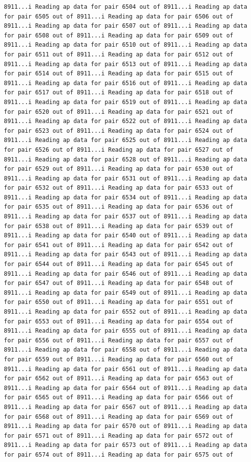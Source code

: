 \documentclass[
]{article}
\begin{document}
\begin{verbatim}
8911...i Reading ap data for pair 6504 out of 8911...i Reading ap data for pair 6505 out of 8911...i Reading ap data for pair 6506 out of 8911...i Reading ap data for pair 6507 out of 8911...i Reading ap data for pair 6508 out of 8911...i Reading ap data for pair 6509 out of 8911...i Reading ap data for pair 6510 out of 8911...i Reading ap data for pair 6511 out of 8911...i Reading ap data for pair 6512 out of 8911...i Reading ap data for pair 6513 out of 8911...i Reading ap data for pair 6514 out of 8911...i Reading ap data for pair 6515 out of 8911...i Reading ap data for pair 6516 out of 8911...i Reading ap data for pair 6517 out of 8911...i Reading ap data for pair 6518 out of 8911...i Reading ap data for pair 6519 out of 8911...i Reading ap data for pair 6520 out of 8911...i Reading ap data for pair 6521 out of 8911...i Reading ap data for pair 6522 out of 8911...i Reading ap data for pair 6523 out of 8911...i Reading ap data for pair 6524 out of 8911...i Reading ap data for pair 6525 out of 8911...i Reading ap data for pair 6526 out of 8911...i Reading ap data for pair 6527 out of 8911...i Reading ap data for pair 6528 out of 8911...i Reading ap data for pair 6529 out of 8911...i Reading ap data for pair 6530 out of 8911...i Reading ap data for pair 6531 out of 8911...i Reading ap data for pair 6532 out of 8911...i Reading ap data for pair 6533 out of 8911...i Reading ap data for pair 6534 out of 8911...i Reading ap data for pair 6535 out of 8911...i Reading ap data for pair 6536 out of 8911...i Reading ap data for pair 6537 out of 8911...i Reading ap data for pair 6538 out of 8911...i Reading ap data for pair 6539 out of 8911...i Reading ap data for pair 6540 out of 8911...i Reading ap data for pair 6541 out of 8911...i Reading ap data for pair 6542 out of 8911...i Reading ap data for pair 6543 out of 8911...i Reading ap data for pair 6544 out of 8911...i Reading ap data for pair 6545 out of 8911...i Reading ap data for pair 6546 out of 8911...i Reading ap data for pair 6547 out of 8911...i Reading ap data for pair 6548 out of 8911...i Reading ap data for pair 6549 out of 8911...i Reading ap data for pair 6550 out of 8911...i Reading ap data for pair 6551 out of 8911...i Reading ap data for pair 6552 out of 8911...i Reading ap data for pair 6553 out of 8911...i Reading ap data for pair 6554 out of 8911...i Reading ap data for pair 6555 out of 8911...i Reading ap data for pair 6556 out of 8911...i Reading ap data for pair 6557 out of 8911...i Reading ap data for pair 6558 out of 8911...i Reading ap data for pair 6559 out of 8911...i Reading ap data for pair 6560 out of 8911...i Reading ap data for pair 6561 out of 8911...i Reading ap data for pair 6562 out of 8911...i Reading ap data for pair 6563 out of 8911...i Reading ap data for pair 6564 out of 8911...i Reading ap data for pair 6565 out of 8911...i Reading ap data for pair 6566 out of 8911...i Reading ap data for pair 6567 out of 8911...i Reading ap data for pair 6568 out of 8911...i Reading ap data for pair 6569 out of 8911...i Reading ap data for pair 6570 out of 8911...i Reading ap data for pair 6571 out of 8911...i Reading ap data for pair 6572 out of 8911...i Reading ap data for pair 6573 out of 8911...i Reading ap data for pair 6574 out of 8911...i Reading ap data for pair 6575 out of 
\end{verbatim}
\end{document}
